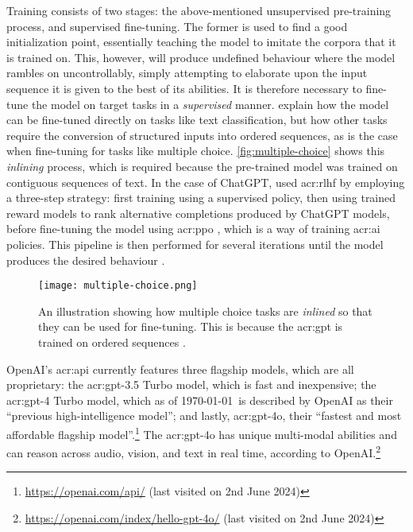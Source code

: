 Training consists of two stages: the above-mentioned unsupervised pre-training process, and supervised fine-tuning. The former is used to find a good initialization point, essentially teaching the model to imitate the corpora that it is trained on. This, however, will produce undefined behaviour where the model rambles on uncontrollably, simply attempting to elaborate upon the input sequence it is given to the best of its abilities. It is therefore necessary to fine-tune the model on target tasks in a \textit{supervised} manner. \cite[4]{radfordImprovingLanguageUnderstanding2018} explain how the model can be fine-tuned directly on tasks like text classification, but how other tasks require the conversion of structured inputs into ordered sequences, as is the case when fine-tuning for tasks like multiple choice. \autoref{fig:multiple-choice} shows this \textit{inlining} process, which is required because the pre-trained model was trained on contiguous sequences of text. In the case of ChatGPT, \citeauthor{openaiIntroducingChatGPT2022} used \gls{acr:rlhf} \citep{christianoDeepReinforcementLearning2023} by employing a three-step strategy: first training using a supervised policy, then using trained reward models to rank alternative completions produced by ChatGPT models, before fine-tuning the model using \gls{acr:ppo} \citep{schulmanProximalPolicyOptimization2017}, which is a way of training \acrshort{acr:ai} policies. This pipeline is then performed for several iterations until the model produces the desired behaviour \citep{openaiIntroducingChatGPT2022}.

\begin{figure}
    \centering
    \texttt{[image: multiple-choice.png]}
    \caption[Inlining of a multiple choice task for GPT fine-tuning]{An illustration showing how multiple choice tasks are \textit{inlined} so that they can be used for fine-tuning. This is because the \acrshort{acr:gpt} is trained on ordered sequences \citep[4]{radfordImprovingLanguageUnderstanding2018}.}
    \label{fig:multiple-choice}
\end{figure}

OpenAI's \acrshort{acr:api} currently features three flagship models, which are all proprietary: the \acrshort{acr:gpt}-3.5 Turbo model, which is fast and inexpensive; the \acrshort{acr:gpt}-4 Turbo model, which as of \today~is described by OpenAI as their \enquote{previous high-intelligence model}; and lastly, \acrshort{acr:gpt}-4o, their \enquote{fastest and most affordable flagship model}.\footnote{\url{https://openai.com/api/} (last visited on 2nd June 2024)} The \acrshort{acr:gpt}-4o has unique multi-modal abilities and can reason across audio, vision, and text in real time, according to OpenAI.\footnote{\url{https://openai.com/index/hello-gpt-4o/} (last visited on 2nd June 2024)}

